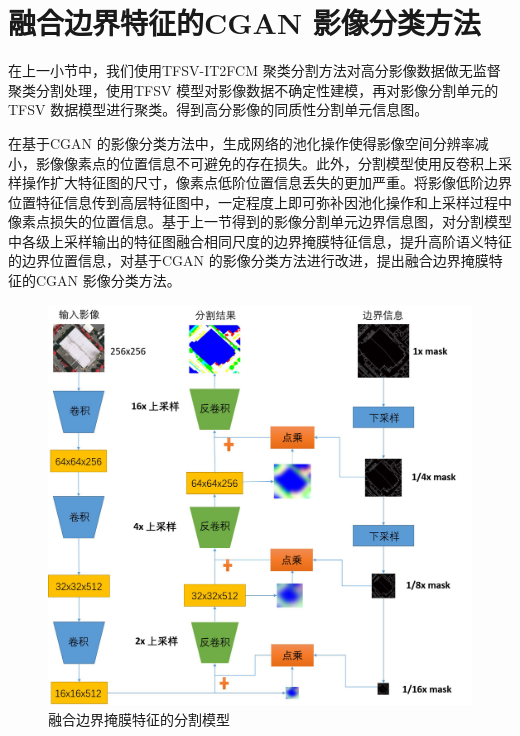 \section{融合边界特征的CGAN 影像分类方法}
\label{sec::chap04-4}

在上一小节中，我们使用TFSV-IT2FCM 聚类分割方法对高分影像数据做无监督聚类分割处理，使用TFSV 模型对影像数据不确定性建模，再对影像分割单元的TFSV 数据模型进行聚类。得到高分影像的同质性分割单元信息图。%


在基于CGAN 的影像分类方法中，生成网络的池化操作使得影像空间分辨率减小，影像像素点的位置信息不可避免的存在损失。此外，分割模型使用反卷积上采样操作扩大特征图的尺寸，像素点低阶位置信息丢失的更加严重。将影像低阶边界位置特征信息传到高层特征图中，一定程度上即可弥补因池化操作和上采样过程中像素点损失的位置信息。基于上一节得到的影像分割单元边界信息图，对分割模型中各级上采样输出的特征图融合相同尺度的边界掩膜特征信息，提升高阶语义特征的边界位置信息，对基于CGAN 的影像分类方法进行改进，提出融合边界掩膜特征的CGAN 影像分类方法。

\begin{figure}[!h]
    \centering
    \includegraphics[width=1.0\textwidth]{figures/mask_gan}
    \caption{融合边界掩膜特征的分割模型}\label{fig:mask_gan}
\end{figure}

